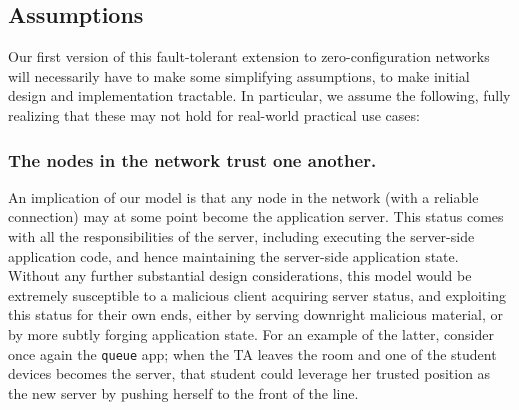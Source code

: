 \subsection{Assumptions}

Our first version of this fault-tolerant extension to zero-configuration networks will necessarily have to make some simplifying assumptions, to make initial design and implementation tractable. 
In particular, we assume the following, fully realizing that these may not hold for real-world practical use cases:

\subsubsection*{The nodes in the network trust one another.} 

An implication of our model is that any node in the network (with a reliable connection) may at some point become the application server.
This status comes with all the responsibilities of the server, including executing the server-side application code, and hence maintaining the server-side application state.
Without any further substantial design considerations, this model would be extremely susceptible to a malicious client acquiring server status, and exploiting this status for their own ends, either by serving downright malicious material, or by more subtly forging application state.
For an example of the latter, consider once again the \texttt{queue} app; when the TA leaves the room and one of the student devices becomes the server, that student could leverage her trusted position as the new server by pushing herself to the front of the line.

